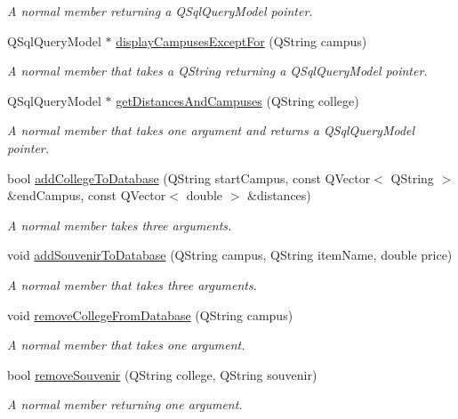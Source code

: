 \begin{DoxyCompactItemize}
\begin{DoxyCompactList}\small\item\em A normal member returning a Q\+Sql\+Query\+Model pointer. \end{DoxyCompactList}\item 
Q\+Sql\+Query\+Model $\ast$ \hyperlink{class_database_a4a1e6a7fbca600ff2420f29b7c4064d0}{display\+Campuses\+Except\+For} (Q\+String campus)
\begin{DoxyCompactList}\small\item\em A normal member that takes a Q\+String returning a Q\+Sql\+Query\+Model pointer. \end{DoxyCompactList}\item 
Q\+Sql\+Query\+Model $\ast$ \hyperlink{class_database_a578021769fe26c6efe0dd0faaad4b540}{get\+Distances\+And\+Campuses} (Q\+String college)
\begin{DoxyCompactList}\small\item\em A normal member that takes one argument and returns a Q\+Sql\+Query\+Model pointer. \end{DoxyCompactList}\item 
bool \hyperlink{class_database_aeaa8fe739adf1bf12343ee8d40125ddd}{add\+College\+To\+Database} (Q\+String start\+Campus, const Q\+Vector$<$ Q\+String $>$ \&end\+Campus, const Q\+Vector$<$ double $>$ \&distances)
\begin{DoxyCompactList}\small\item\em A normal member takes three arguments. \end{DoxyCompactList}\item 
void \hyperlink{class_database_a89d1c1802613ecaa1bda990465eeb5a3}{add\+Souvenir\+To\+Database} (Q\+String campus, Q\+String item\+Name, double price)
\begin{DoxyCompactList}\small\item\em A normal member that takes three arguments. \end{DoxyCompactList}\item 
void \hyperlink{class_database_ac1affb187b17ae9368aaa9a0cbd98fd3}{remove\+College\+From\+Database} (Q\+String campus)
\begin{DoxyCompactList}\small\item\em A normal member that takes one argument. \end{DoxyCompactList}\item 
bool \hyperlink{class_database_aae3e40f0501e75700b93548d83b76cfd}{remove\+Souvenir} (Q\+String college, Q\+String souvenir)
\begin{DoxyCompactList}\small\item\em A normal member returning one argument. \end{DoxyCompactList}\item 

\end{DoxyCompactItemize}
